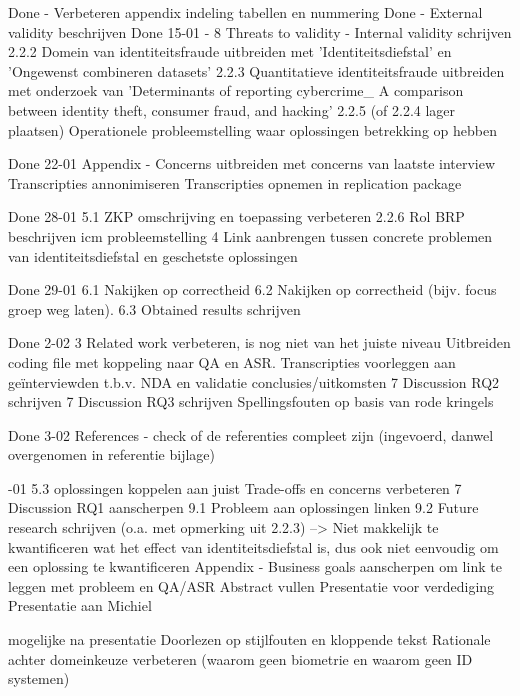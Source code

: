 Done - Verbeteren appendix indeling tabellen en nummering
Done - External validity beschrijven
Done 15-01 - 
8 Threats to validity - Internal validity schrijven
2.2.2 Domein van identiteitsfraude uitbreiden met 'Identiteitsdiefstal' en 'Ongewenst combineren datasets'
2.2.3 Quantitatieve identiteitsfraude uitbreiden met onderzoek van 'Determinants of reporting cybercrime_ A
comparison between identity theft, consumer fraud, and hacking'
2.2.5 (of 2.2.4 lager plaatsen) Operationele probleemstelling waar oplossingen betrekking op hebben

Done 22-01
Appendix - Concerns uitbreiden met concerns van laatste interview
Transcripties annonimiseren
Transcripties opnemen in replication package

Done 28-01
5.1 ZKP omschrijving en toepassing verbeteren
2.2.6 Rol BRP beschrijven icm probleemstelling
4 Link aanbrengen tussen concrete problemen van identiteitsdiefstal en geschetste oplossingen

Done 29-01
6.1 Nakijken op correctheid
6.2 Nakijken op correctheid (bijv. focus groep weg laten).
6.3 Obtained results schrijven

Done 2-02
3 Related work verbeteren, is nog niet van het juiste niveau
Uitbreiden coding file met koppeling naar QA en ASR.
Transcripties voorleggen aan geïnterviewden t.b.v. NDA en validatie conclusies/uitkomsten
7 Discussion RQ2 schrijven
7 Discussion RQ3 schrijven
Spellingsfouten op basis van rode kringels

Done 3-02
References - check of de referenties compleet zijn (ingevoerd, danwel overgenomen in referentie bijlage)


-01
5.3 oplossingen koppelen aan juist Trade-offs en concerns verbeteren
7 Discussion RQ1 aanscherpen
9.1 Probleem aan oplossingen linken
9.2 Future research schrijven (o.a. met opmerking uit 2.2.3)
--> Niet makkelijk te kwantificeren wat het effect van identiteitsdiefstal is, dus ook niet eenvoudig om een oplossing te kwantificeren
Appendix - Business goals aanscherpen om link te leggen met probleem en QA/ASR
Abstract vullen
Presentatie voor verdediging
Presentatie aan Michiel

mogelijke \todo na presentatie
Doorlezen op stijlfouten en kloppende tekst
Rationale achter domeinkeuze verbeteren (waarom geen biometrie en waarom geen ID systemen)